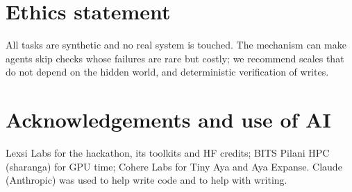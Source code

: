 \documentclass[11pt]{article}
\begin{document}
\section*{Ethics statement}
All tasks are synthetic and no real system is touched. The mechanism can make agents skip checks whose failures are
rare but costly; we recommend scales that do not depend on the hidden world, and deterministic verification of writes.

\section*{Acknowledgements and use of AI}
Lexsi Labs for the hackathon, its toolkits and HF credits; BITS Pilani HPC (sharanga) for GPU time; Cohere Labs for
Tiny Aya and Aya Expanse. Claude (Anthropic) was used to help write code and to help with writing.




\appendix


\end{document}

